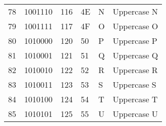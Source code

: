 \begin{center}
\begin{longtable}{llllll}
\rowcolor[HTML]{F3F6F6} 
{\color[HTML]{404040} 78}               & {\color[HTML]{404040} 1001110}         & {\color[HTML]{404040} 116}            & {\color[HTML]{404040} 4E}                   & {\color[HTML]{404040} N}                  & {\color[HTML]{404040} Uppercase N}                           \\
\rowcolor[HTML]{FCFCFC} 
{\color[HTML]{404040} 79}               & {\color[HTML]{404040} 1001111}         & {\color[HTML]{404040} 117}            & {\color[HTML]{404040} 4F}                   & {\color[HTML]{404040} O}                  & {\color[HTML]{404040} Uppercase O}                           \\
\rowcolor[HTML]{F3F6F6} 
{\color[HTML]{404040} 80}               & {\color[HTML]{404040} 1010000}         & {\color[HTML]{404040} 120}            & {\color[HTML]{404040} 50}                   & {\color[HTML]{404040} P}                  & {\color[HTML]{404040} Uppercase P}                           \\
\rowcolor[HTML]{FCFCFC} 
{\color[HTML]{404040} 81}               & {\color[HTML]{404040} 1010001}         & {\color[HTML]{404040} 121}            & {\color[HTML]{404040} 51}                   & {\color[HTML]{404040} Q}                  & {\color[HTML]{404040} Uppercase Q}                           \\
\rowcolor[HTML]{F3F6F6} 
{\color[HTML]{404040} 82}               & {\color[HTML]{404040} 1010010}         & {\color[HTML]{404040} 122}            & {\color[HTML]{404040} 52}                   & {\color[HTML]{404040} R}                  & {\color[HTML]{404040} Uppercase R}                           \\
\rowcolor[HTML]{FCFCFC} 
{\color[HTML]{404040} 83}               & {\color[HTML]{404040} 1010011}         & {\color[HTML]{404040} 123}            & {\color[HTML]{404040} 53}                   & {\color[HTML]{404040} S}                  & {\color[HTML]{404040} Uppercase S}                           \\
\rowcolor[HTML]{F3F6F6} 
{\color[HTML]{404040} 84}               & {\color[HTML]{404040} 1010100}         & {\color[HTML]{404040} 124}            & {\color[HTML]{404040} 54}                   & {\color[HTML]{404040} T}                  & {\color[HTML]{404040} Uppercase T}                           \\
\rowcolor[HTML]{FCFCFC} 
{\color[HTML]{404040} 85}               & {\color[HTML]{404040} 1010101}         & {\color[HTML]{404040} 125}            & {\color[HTML]{404040} 55}                   & {\color[HTML]{404040} U}                  & {\color[HTML]{404040} Uppercase U}                           \\

\end{longtable}
\end{center}
